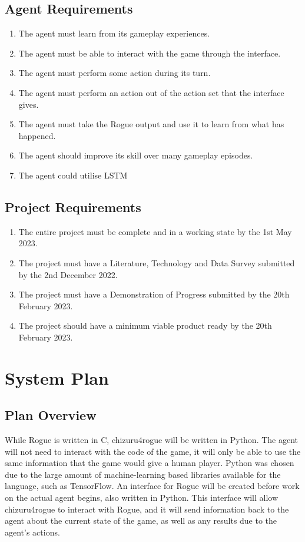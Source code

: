 \documentclass[11pt,a4paper]{article}
\begin{document}
\subsection{Agent Requirements}
\begin{enumerate}
	\item The agent must learn from its gameplay experiences.
	\item The agent must be able to interact with the game through the interface.
	\item The agent must perform some action during its turn.
	\item The agent must perform an action out of the action set that the interface gives.
	\item The agent must take the Rogue output and use it to learn from what has happened.
	\item The agent should improve its skill over many gameplay episodes.
	\item The agent could utilise LSTM
\end{enumerate}

\subsection{Project Requirements}
\begin{enumerate}
	\item The entire project must be complete and in a working state by the 1st May 2023.
	\item The project must have a Literature, Technology and Data Survey submitted by the 2nd December 2022.
	\item The project must have a Demonstration of Progress submitted by the 20th February 2023.
	\item The project should have a minimum viable product ready by the 20th February 2023.
\end{enumerate}

\section{System Plan}
\subsection{Plan Overview}
While Rogue is written in C, chizuru4rogue will be written in Python. The agent will not need to interact with the code of the game, it will only be able to use the same information that the game would give a human player. Python was chosen due to the large amount of machine-learning based libraries available for the language, such as TensorFlow.
An interface for Rogue will be created before work on the actual agent begins, also written in Python. This interface will allow chizuru4rogue to interact with Rogue, and it will send information back to the agent about the current state of the game, as well as any results due to the agent's actions.
\end{document}
